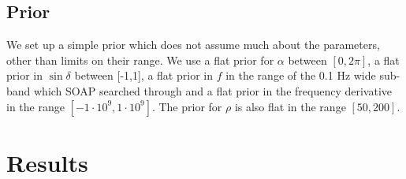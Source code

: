%
\subsection{Prior}
%
We set up a simple prior which does not assume much about the parameters, other than limits on their range. 
We use a flat prior for $\alpha$ between $[0,2\pi]$, a flat prior in $\sin{\delta}$ between [-1,1], a flat prior in $f$ in the range of the 0.1 Hz wide sub-band which SOAP searched through and a flat prior in the frequency derivative in the range $[-1\cdot 10^{9},1\cdot 10^{9}]$.
The prior for $\rho$ is also flat in the range $[50,200]$.

\section{Results}

